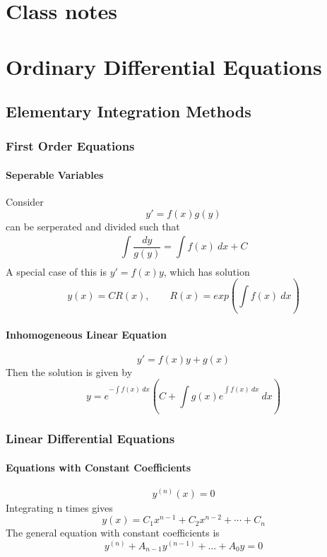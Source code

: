\chapter{Class notes} 


\chapter{Ordinary Differential Equations} 
\section{Elementary Integration Methods}
\label{sec:Elementary Integration Methods}
\subsection{First Order Equations}
\label{subsec:First Order Equations}
\subsubsection{Seperable Variables}
Consider
\begin{equation}
    y '= f(x) g(y)      
    \label{eq:seperable}
\end{equation}
can be serperated and divided such that 
\[
\int\limits_{ }^{ } \frac{ dy }{ g(y)  } = \int\limits_{ }^{ } f(x) \ dx + C
\]
A special case of this is $ y'= f(x) y $, which has solution 
\[
    y(x) = CR(x) , \qquad R(x) = exp\left( \int\limits_{ }^{ } f(x) \ dx\right) 
\]

\subsubsection{Inhomogeneous Linear Equation}
\begin{equation}
    y ' =  f(x) y + g(x) 
    \label{eq:inhomoLineq}
\end{equation}
Then the solution is given by 
\[
    y = e _{  }^{ - \int\limits_{ }^{ } f(x)\  dx    } \left( C + \int\limits_{ }^{ } g(x)
    e _{  }^{ \int\limits_{ }^{ } f(x) \ dx } \ dx\right)  
\]


\subsection{Linear Differential Equations}
\label{subsec:Linear Differential Equations}
\subsubsection{Equations with Constant Coefficients}
\begin{equation}
    y _{  }^{ (n) } (x) = 0
    \label{eq:constCoefHomo}
\end{equation}
Integrating n times gives 
\[
    y(x) = C_1x^{n-1} +C_2x^{n-2} + \cdots + C_{n}  
\]
The general equation with constant coefficients is  
\[
    y _{  }^{ (n)  } + A_{n-1}y _{  }^{ (n-1) } + \dots + A_0y = 0
\]

